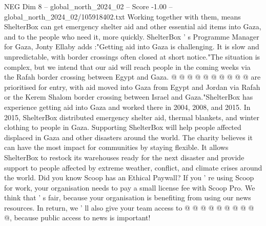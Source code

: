 \begin{textsample}{NEG Dim 8 – global\_north\_2024\_02 – Score -1.00 – global\_north\_2024\_02/105918402.txt}
Working together with them, means ShelterBox can get emergency shelter aid and other essential aid items into Gaza, and to the people who need it, more quickly.
ShelterBox ' s Programme Manager for Gaza, Jonty Ellaby adds :"Getting aid into Gaza is challenging.
It is slow and unpredictable, with border crossings often closed at short notice."The situation is complex, but we intend that our aid will reach people in the coming weeks via the Rafah border crossing between Egypt and Gaza. @ @ @ @ @ @ @ @ @ @ are prioritised for entry, with aid moved into Gaza from Egypt and Jordan via Rafah or the Kerem Shalom border crossing between Israel and Gaza."ShelterBox has experience getting aid into Gaza and worked there in 2004, 2008, and 2015.
In 2015, ShelterBox distributed emergency shelter aid, thermal blankets, and winter clothing to people in Gaza.
Supporting ShelterBox will help people affected displaced in Gaza and other disasters around the world.
The charity believes it can have the most impact for communities by staying flexible.
It allows ShelterBox to restock its warehouses ready for the next disaster and provide support to people affected by extreme weather, conflict, and climate crises around the world.
Did you know Scoop has an Ethical Paywall?
If you ' re using Scoop for work, your organisation needs to pay a small license fee with Scoop Pro.
We think that ' s fair, because your organisation is benefiting from using our news resources.
In return, we ' ll also give your team access to @ @ @ @ @ @ @ @ @ @, because public access to news is important!

\end{textsample}
